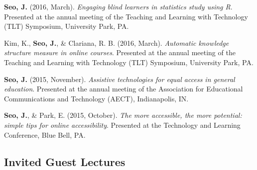 \documentclass[11pt, a4paper]{awesome-cv}
\begin{document}
\textbf{Seo, J.} (2016, March). \emph{Engaging blind learners in
statistics study using R}. Presented at the annual meeting of the
Teaching and Learning with Technology (TLT) Symposium, University Park,
PA.

Kim, K., \textbf{Seo, J.}, \& Clariana, R. B. (2016, March).
\emph{Automatic knowledge structure measure in online courses}.
Presented at the annual meeting of the Teaching and Learning with
Technology (TLT) Symposium, University Park, PA.

\textbf{Seo, J.} (2015, November). \emph{Assistive technologies for
equal access in general education}. Presented at the annual meeting of
the Association for Educational Communications and Technology (AECT),
Indianapolis, IN.

\textbf{Seo, J.}, \& Park, E. (2015, October). \emph{The more
accessible, the more potential: simple tips for online accessibility}.
Presented at the Technology and Learning Conference, Blue Bell, PA.

\hypertarget{invited-guest-lectures}{%
\subsection{Invited Guest Lectures}\label{invited-guest-lectures}}
\end{document}

